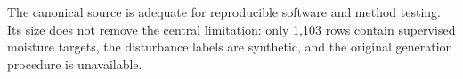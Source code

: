 \begin{engineeringbox}
The canonical source is adequate for reproducible software and method testing. Its size does not remove the central limitation: only 1,103 rows contain supervised moisture targets, the disturbance labels are synthetic, and the original generation procedure is unavailable.
\end{engineeringbox}
